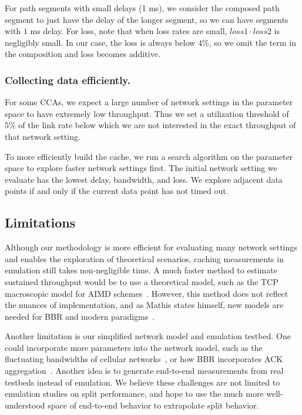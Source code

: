For path segments with small delays (1 ms),
we consider the composed path segment to
just have the delay of the longer segment, so we can have segments
with $1$ ms delay. For loss, note that when loss rates are small, $loss1 \cdot
loss2$ is negligibly small. In our case, the loss is always below $4\%$, so we
omit the term in the composition and loss becomes additive.

\subsubsection{Collecting data efficiently.}
For some CCAs, we expect a large number of network settings in the parameter
space to have extremely low throughput. Thus we set a utilization threshold of
$5\%$ of the link rate below which we are not interested in the exact throughput
of that network setting.

To more efficiently build the cache, we run a search algorithm on
the parameter space to explore faster network settings first.
The initial network setting we evaluate has the lowest delay, bandwidth, and
loss. We explore adjacent data points if and only if the current data point has
not timed out.

\subsection{Limitations}
\label{sec:splitting:heuristic:limitations}

Although our methodology is more efficient for evaluating many network
settings and enables the exploration of theoretical scenarios,
caching measurements in emulation still takes non-negligible time. A much faster
method to estimate sustained throughput would be to use a theoretical model, such as the
TCP macroscopic model for AIMD schemes~\cite{mathis1997macroscopic}.
However, this method does not reflect the nuances of implementation, and as
Mathis states himself, new models are needed for BBR and modern paradigms~\cite
{mathis2019deprecating,mathis2008reflections}.

Another limitation is our simplified network model and emulation testbed.
One could incorporate more parameters into the network model, such as the
fluctuating bandwidths of cellular networks~\cite{hayes2019mmwave}, or how BBR
incorporates ACK aggregation~\cite{cardwell2018bbr-ietf101}. Another idea is to
generate end-to-end measurements from real testbeds instead of emulation. We
believe these challenges are not limited to emulation studies on split
performance, and hope to use the much more well-understood space of end-to-end
behavior to extrapolate split behavior.

